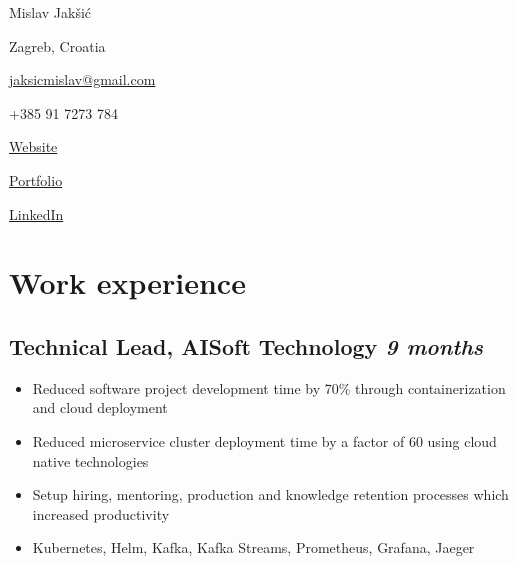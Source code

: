 \documentclass[a4paper]{article}
\newcommand{\bolditalicpair}
[2]
{\textbf{#1} \texorpdfstring{\hfill}{} \textit{#2}}
\begin{document}
\begin{multicols}{3}

\noindent
\begin{minipage}{.22\textwidth}
\raggedright

{\huge Mislav Jakšić}

Zagreb, Croatia
\end{minipage}

\noindent
\begin{minipage}{.50\textwidth}
\raggedleft

\href{mailto:jaksicmislav@gmail.com}{jaksicmislav@gmail.com}

+385 91 7273 784

\end{minipage}

\noindent
\begin{minipage}{.32\textwidth}
\raggedleft

\href{https://mislav-jaksic.from.hr/}{Website}

\href{https://github.com/MislavJaksic}{Portfolio}

\href{https://www.linkedin.com/in/mislav-jaksic}{LinkedIn}

\end{minipage}

\end{multicols}



\section{Work experience}
\subsection{\bolditalicpair{Technical Lead, AISoft Technology}{9 months}}

\begin{itemize}
  \item Reduced software project development time by 70\% through containerization and cloud deployment
  \item Reduced microservice cluster deployment time by a factor of 60 using cloud native technologies
  \item Setup hiring, mentoring, production and knowledge retention processes which increased productivity
  \item Kubernetes, Helm, Kafka, Kafka Streams, Prometheus, Grafana, Jaeger
\end{itemize}
\end{document}
